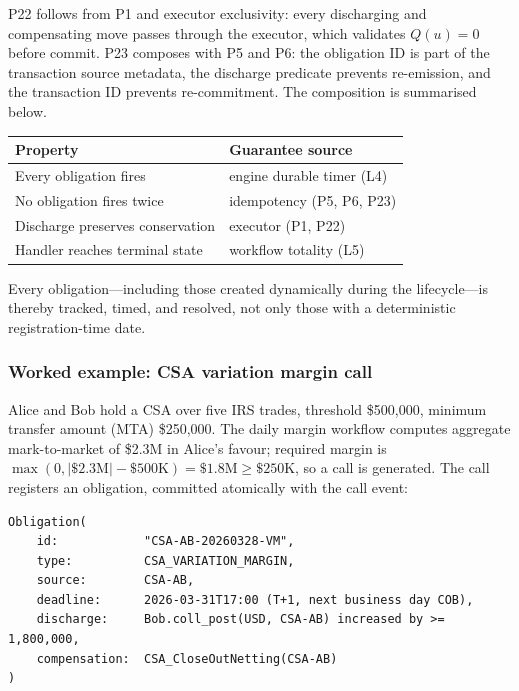 \documentclass[11pt,a4paper]{article}
\begin{document}
\noindent P22 follows from P1 and executor exclusivity: every discharging and compensating move passes through the executor, which validates $Q(u)=0$ before commit. P23 composes with P5 and P6: the obligation ID is part of the transaction source metadata, the discharge predicate prevents re-emission, and the transaction ID prevents re-commitment. The composition is summarised below.

\begin{center}
\small
\begin{tabular}{l l}
\toprule
\textbf{Property} & \textbf{Guarantee source} \\
\midrule
Every obligation fires & engine durable timer (L4) \\
No obligation fires twice & idempotency (P5, P6, P23) \\
Discharge preserves conservation & executor (P1, P22) \\
Handler reaches terminal state & workflow totality (L5) \\
\bottomrule
\end{tabular}
\end{center}

\noindent Every obligation---including those created dynamically during the lifecycle---is thereby tracked, timed, and resolved, not only those with a deterministic registration-time date.

\subsubsection{Worked example: CSA variation margin call}
\label{sec:obligation-example-csa}

Alice and Bob hold a CSA over five IRS trades, threshold \$500{,}000, minimum transfer amount (MTA) \$250{,}000. The daily margin workflow computes aggregate mark-to-market of \$2.3M in Alice's favour; required margin is $\max(0, |\$2.3\text{M}| - \$500\text{K}) = \$1.8\text{M} \geq \$250\text{K}$, so a call is generated. The call registers an obligation, committed atomically with the call event:

\begin{lstlisting}
Obligation(
    id:            "CSA-AB-20260328-VM",
    type:          CSA_VARIATION_MARGIN,
    source:        CSA-AB,
    deadline:      2026-03-31T17:00 (T+1, next business day COB),
    discharge:     Bob.coll_post(USD, CSA-AB) increased by >= 1,800,000,
    compensation:  CSA_CloseOutNetting(CSA-AB)
)
\end{lstlisting}
\end{document}
